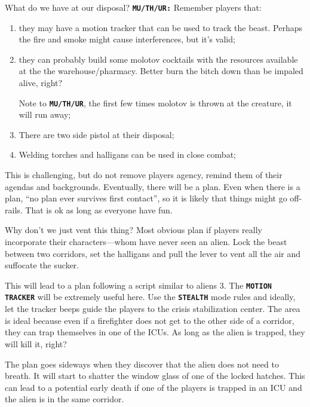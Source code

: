 \begin{rpg-commentbox}{What do we have at our disposal?}
   \texttt{\textbf{MU/TH/UR:}} Remember players that:
   
   
   \begin{enumerate}
      \item they may have a motion tracker that can be used to track the beast. Perhaps the fire and smoke might cause interferences, but it's valid;
      \item they can probably build some molotov cocktails with the resources available at the the warehouse/pharmacy. Better burn the bitch down than be impaled alive, right?
      
      Note to \texttt{\textbf{MU/TH/UR}}, the first few times molotov is thrown at the creature, it will run away;
      
      \item There are two side pistol at their disposal;

      \item Welding torches and halligans can be used in close combat;
   \end{enumerate}

   This is challenging, but do not remove players agency, remind them of their agendas and backgrounds. Eventually, there will be a plan. Even when there is a plan, ``no plan ever survives first contact'', so it is likely that things might go off-rails. That is ok as long as everyone have fun. 
\end{rpg-commentbox}

\newsect

\begin{rpg-commentbox}{Why don't we just vent this thing?}
    Most obvious plan if players really incorporate their characters---whom have never seen an alien. Lock the beast between two corridors, set the halligans and pull the lever to vent all the air and suffocate the sucker. 
    
    This will lead to a plan following a script similar to aliens 3. The \texttt{\textbf{MOTION TRACKER}} will be extremely useful here. Use the \texttt{\textbf{STEALTH}} mode rules and ideally, let the tracker beeps guide the players to the crisis stabilization center. The area is ideal because even if a firefighter does not get to the other side of a corridor, they can trap themselves in one of the ICUs. As long as the alien is trapped, they will kill it, right?

    The plan goes sideways when they discover that the alien does not need to breath. It will start to shatter the window glass of one of the locked hatches. This can lead to a potential early death if one of the players is trapped in an ICU and the alien is in the same corridor.
\end{rpg-commentbox}


